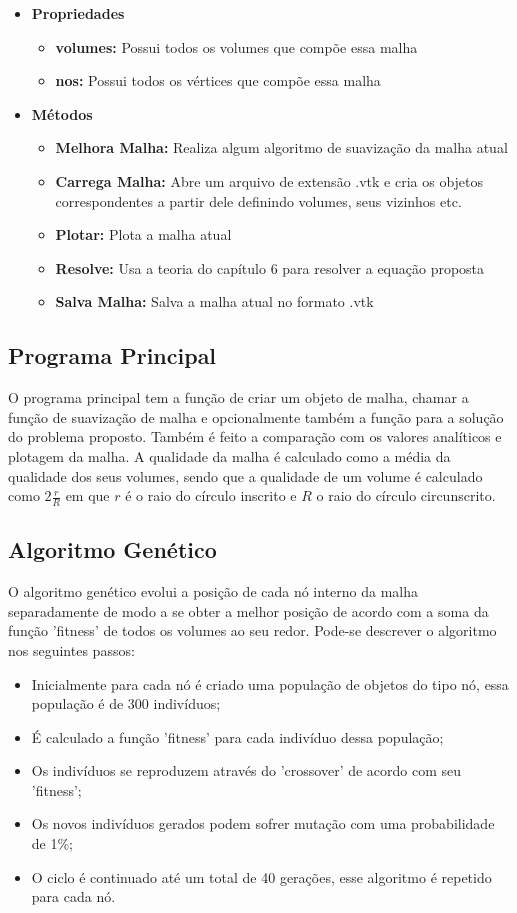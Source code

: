\begin{itemize}
    \item \textbf{Propriedades}
    \begin{itemize}
        \item \textbf{volumes:} Possui todos os volumes que compõe essa malha
        \item \textbf{nos:} Possui todos os vértices que compõe essa malha
    \end{itemize}
    \item \textbf{Métodos}
    \begin{itemize}
        \item \textbf{Melhora Malha:} Realiza algum algoritmo de suavização da malha atual
        \item \textbf{Carrega Malha:} Abre um arquivo de extensão .vtk e cria os objetos correspondentes a partir dele definindo volumes, seus vizinhos etc.
        \item \textbf{Plotar:} Plota a malha atual
        \item \textbf{Resolve:} Usa a teoria do capítulo 6 para resolver a equação proposta
        \item \textbf{Salva Malha:} Salva a malha atual no formato .vtk
    \end{itemize}
\end{itemize}

\subsection{Programa Principal}
O programa principal tem a função de criar um objeto de malha, chamar a função de suavização de malha e opcionalmente também a função para a solução do problema proposto. Também é feito a comparação com os valores analíticos e plotagem da malha. A qualidade da malha é calculado como a média da qualidade dos seus volumes, sendo que a qualidade de um volume é calculado como $2\frac{r}{R}$ em que $r$ é o raio do círculo inscrito e $R$ o raio do círculo circunscrito.

\subsection{Algoritmo Genético}
O algoritmo genético evolui a posição de cada nó interno da malha separadamente de modo a se obter a melhor posição de acordo com a soma da função 'fitness' de todos os volumes ao seu redor. Pode-se descrever o algoritmo nos seguintes passos:

\begin{itemize}
    \item Inicialmente para cada nó é criado uma população de objetos do tipo nó, essa população é de 300 indivíduos;
    \item É calculado a função 'fitness' para cada indivíduo dessa população;
    \item Os indivíduos se reproduzem através do 'crossover' de acordo com seu 'fitness';
    \item Os novos indivíduos gerados podem sofrer mutação com uma probabilidade de 1\%;
    \item O ciclo é continuado até um total de 40 gerações, esse algoritmo é repetido para cada nó.
\end{itemize}